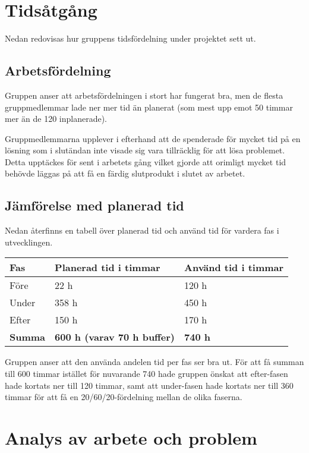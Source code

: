 \documentclass[10pt,oneside,swedish]{lips}
\begin{document}
\cleardoublepage
{}\cfoot{\thepage}

\section{Tidsåtgång}

Nedan redovisas hur gruppens tidsfördelning under projektet sett ut.

\subsection{Arbetsfördelning}

Gruppen anser att arbetsfördelningen i stort har fungerat bra, men de flesta
gruppmedlemmar lade ner mer tid än planerat (som mest upp emot 50 timmar mer än
de 120 inplanerade).

Gruppmedlemmarna upplever i efterhand att de spenderade för mycket tid på en
lösning som i slutändan inte visade sig vara tillräcklig för att lösa problemet.
Detta upptäckes för sent i arbetets gång vilket gjorde att orimligt mycket tid
behövde läggas på att få en färdig slutprodukt i slutet av arbetet. 

\subsection{Jämförelse med planerad tid}

Nedan återfinns en tabell över planerad tid och använd tid för vardera fas i
utvecklingen. 

\begin{tabular}{|l|l|l|} \hline
	\textbf{Fas} & \textbf{Planerad tid i timmar} & \textbf{Använd tid i timmar} \\\hline
	Före & 22 h & 120 h \\\hline
	Under & 358 h & 450 h \\\hline
	Efter & 150 h & 170 h \\\hline
	\textbf{Summa} & \textbf{600 h (varav 70 h buffer)} & \textbf{740 h} \\\hline
\end{tabular}

Gruppen anser att den använda andelen tid per fas ser bra ut. För att få summan
till 600 timmar istället för nuvarande 740 hade gruppen önskat att efter-fasen
hade kortats ner till 120 timmar, samt att under-fasen hade kortats ner till 360
timmar för att få en 20/60/20-fördelning mellan de olika faserna.

\section{Analys av arbete och problem}
\end{document}
